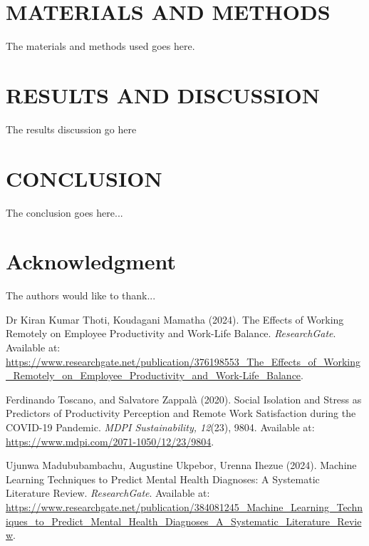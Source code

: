 \documentclass[conference]{IEEEtran}
\begin{document}
\section{MATERIALS AND METHODS}
The materials and methods used goes here.

\section{RESULTS AND DISCUSSION}
The results discussion go here

\section{CONCLUSION}
The conclusion goes here...


\section{Acknowledgment}
The authors would like to thank...


\begin{thebibliography}{1}

 Dr Kiran Kumar Thoti, Koudagani Mamatha (2024). The Effects of Working Remotely on Employee Productivity and Work-Life Balance. \textit{ResearchGate}. Available at: \url{https://www.researchgate.net/publication/376198553_The_Effects_of_Working_Remotely_on_Employee_Productivity_and_Work-Life_Balance}.

 Ferdinando Toscano, and Salvatore Zappalà (2020). Social Isolation and Stress as Predictors of Productivity Perception and Remote Work Satisfaction during the COVID-19 Pandemic. \textit{MDPI Sustainability, 12}(23), 9804. Available at: \url{https://www.mdpi.com/2071-1050/12/23/9804}.

 Ujunwa Madububambachu, Augustine Ukpebor, Urenna Ihezue (2024). Machine Learning Techniques to Predict Mental Health Diagnoses: A Systematic Literature Review. \textit{ResearchGate}. Available at: \url{https://www.researchgate.net/publication/384081245_Machine_Learning_Techniques_to_Predict_Mental_Health_Diagnoses_A_Systematic_Literature_Review}.

\end{thebibliography}





\end{document}
